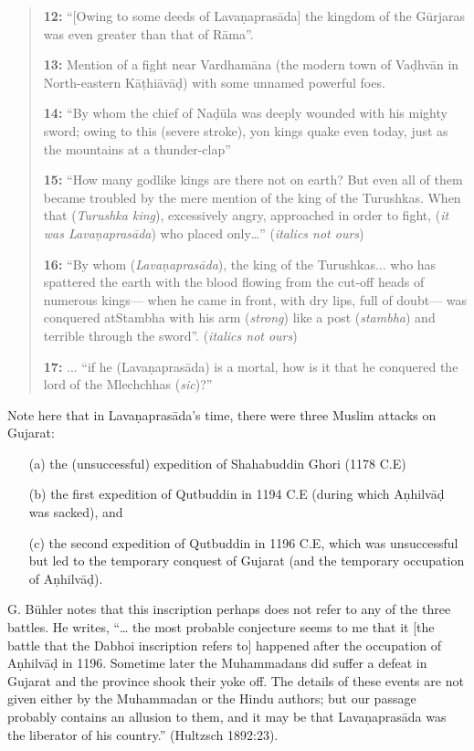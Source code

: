 \begin{quote}
\smallskip
{\bf 12:} “[Owing to some deeds of Lavaṇaprasāda] the kingdom of the Gūrjaras was even greater than that of Rāma”. 

\smallskip
{\bf 13:} Mention of a fight near Vardhamāna (the modern town of Vaḍhvān in North-eastern Kāṭhiāvāḍ) with some unnamed powerful foes.

\smallskip
{\bf 14:} “By whom the chief of Naḍūla was deeply wounded with his mighty sword; owing to this (severe stroke), yon kings quake even today, just as the mountains at a thunder-clap”

\smallskip
{\bf 15:} “How many godlike kings are there not on earth? But even all of them became troubled by the mere mention of the king of the Turushkas. When that ({\sl Turushka king}), excessively angry, approached in order to fight, ({\sl it was Lavaṇaprasāda}) who placed only…” ({\sl italics not ours})

\smallskip
{\bf 16:} “By whom ({\sl Lavaṇaprasāda}), the king of the Turushkas... who has spattered the earth with the blood flowing from the cut-off heads of numerous kings— when he came in front, with dry lips, full of doubt— was conquered at\break Stambha with his arm ({\sl strong}) like a post ({\sl stambha}) and terrible through the sword”. ({\sl italics not ours})

\smallskip
{\bf 17:} ... “if he (Lavaṇaprasāda) is a mortal, how is it that he conquered the lord of the Mlechchhas ({\sl sic})?”
\end{quote}

\smallskip
Note here that in Lavaṇaprasāda’s time, there were three Muslim attacks on Gujarat: 
\begin{itemize}
\itemsep=0pt
\item[(a)] the (unsuccessful) expedition of Shahabuddin Ghori  (1178 C.E) 
\item[(b)] the first expedition of Qutbuddin in 1194 C.E (during which Aṇhilvāḍ was sacked), and 
\item[(c)] the second expedition of Qutbuddin in 1196 C.E, which was unsuccessful but led to the temporary conquest of Gujarat (and the temporary occupation of Aṇhilvāḍ). 
\end{itemize}
G. Bühler notes that this inscription perhaps does not refer to any of the three battles. He writes, “… the most probable conjecture seems to me that it [the battle that the Dabhoi inscription refers to] happened after the occupation of Aṇhilvāḍ in 1196. Sometime later the Muhammadans did suffer a defeat in Gujarat and the province shook their yoke off. The details of these events are not given either by the Muhammadan or the Hindu authors; but our passage probably contains an allusion to them, and it may be that Lavaṇaprasāda was the liberator of his country.” (Hultzsch 1892:23). 

